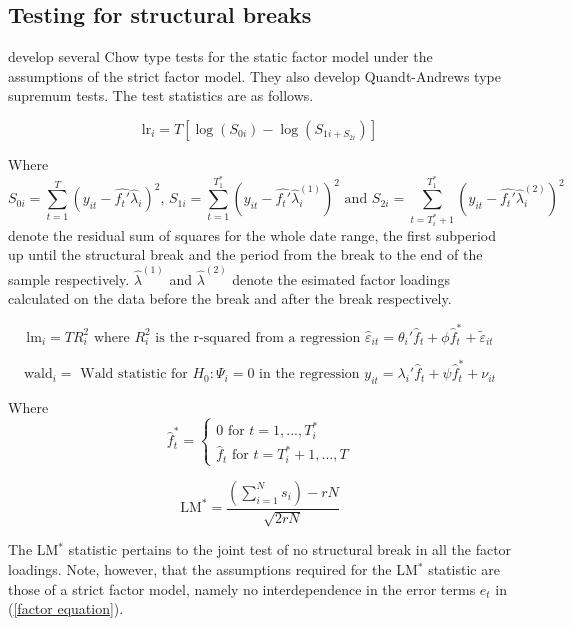 \documentclass[12pt]{article}
\begin{document}
\subsection{Testing for structural breaks}
\citet{breitung2011testing} develop several Chow type tests for the static factor model under the assumptions of the strict factor model. They also develop Quandt-Andrews type supremum tests. The test statistics are as follows.


\begin{equation}
	\label{LR-Statistic}
	\text{lr}_i = T [ \log(S_{0i}) - \log(S_{1i + S_{2i}}) ]
\end{equation}

Where $$S_{0i} = \sum_{t=1}^{T}(y_{it} - \hat{f_t'} \hat \lambda_i)^2 \text{, } S_{1i} = \sum_{t=1}^{T_1^*}(y_{it} - \hat{f_t'} \hat \lambda_i^{(1)})^2 \text{ and } S_{2i} = \sum_{t=T^*_i+1}^{T_1^*}(y_{it} - \hat{f_t'} \hat \lambda_i^{(2)})^2 $$
denote the residual sum of squares for the whole date range, the first subperiod up until the structural break and the period from the break to the end of the sample respectively.
$\hat \lambda^{(1)}$ and $\hat \lambda^{(2)}$ denote the esimated factor loadings calculated on the data before the break and after the break respectively.

\begin{equation}
	\label{LM-Statistic}
	\text{lm}_i = T R^2_i \text{ where $R_i^2$ is the r-squared from a regression } \hat \varepsilon_{it} = \theta_i' \hat f_t + \phi \hat f_t^* + \tilde \varepsilon_{it}
\end{equation}

\begin{equation}
	\label{Wald-Statistic}
	\text{wald}_i = \text{ Wald statistic for $H_0: \Psi_i = 0$ in the regression } y_{it} = \lambda_i' \hat f_t + \psi \hat f_t^* + \nu_{it}
\end{equation}

Where 
$$\hat f_t^* = \begin{cases} 0 \text{ for } t=1, ..., T_i^* \\ \hat f_t \text{ for } t=T_i^*+1, ..., T \end{cases}$$

\begin{equation}
	\label{LM-Statistic}
	\text{LM}^* = \frac{\left( \sum_{i=1}^N s_i \right) -rN}{\sqrt{2rN}}
\end{equation}

The LM$^*$ statistic pertains to the joint test of no structural break in all the factor loadings. Note, however, that the assumptions required for the LM$^*$ statistic are those of a strict factor model, namely no interdependence in the error terms $e_t$ in (\ref{factor equation}).
\end{document}

